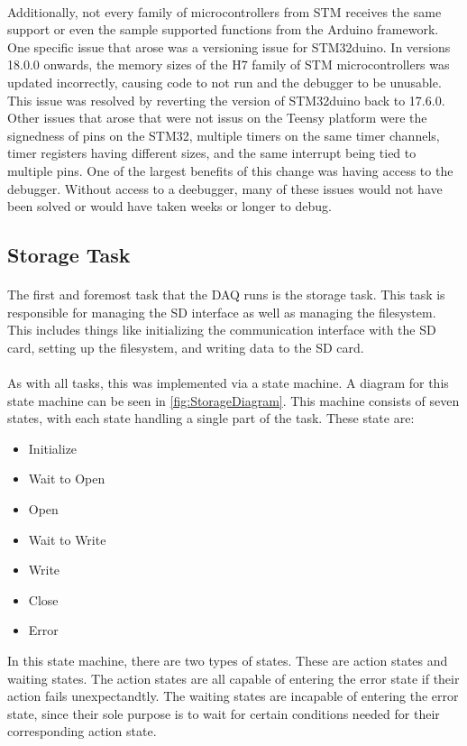 \paragraph{}
Additionally, not every family of microcontrollers from STM receives the same support or even the sample supported functions from the Arduino framework.
One specific issue that arose was a versioning issue for STM32duino.
In versions 18.0.0 onwards, the memory sizes of the H7 family of STM microcontrollers was updated incorrectly, causing code to not run and the debugger to be unusable.
This issue was resolved by reverting the version of STM32duino back to 17.6.0.
Other issues that arose that were not issus on the Teensy platform were the signedness of pins on the STM32, multiple timers on the same timer channels, timer registers having different sizes, and the same interrupt being tied to multiple pins.
One of the largest benefits of this change was having access to the debugger.
Without access to a deebugger, many of these issues would not have been solved or would have taken weeks or longer to debug.

\subsection{Storage Task}

\paragraph{}
The first and foremost task that the DAQ runs is the storage task.
This task is responsible for managing the SD interface as well as managing the filesystem.
This includes things like initializing the communication interface with the SD card, setting up the filesystem, and writing data to the SD card.

\paragraph{}
As with all tasks, this was implemented via a state machine.
A diagram for this state machine can be seen in \cref{fig:StorageDiagram}.
This machine consists of seven states, with each state handling a single part of the task.
These state are:
\begin{itemize}
	\item Initialize
	\item Wait to Open
	\item Open
	\item Wait to Write
	\item Write
	\item Close
	\item Error
\end{itemize}
In this state machine, there are two types of states.
These are action states and waiting states.
The action states are all capable of entering the error state if their action fails unexpectandtly.
The waiting states are incapable of entering the error state, since their sole purpose is to wait for certain conditions needed for their corresponding action state.

